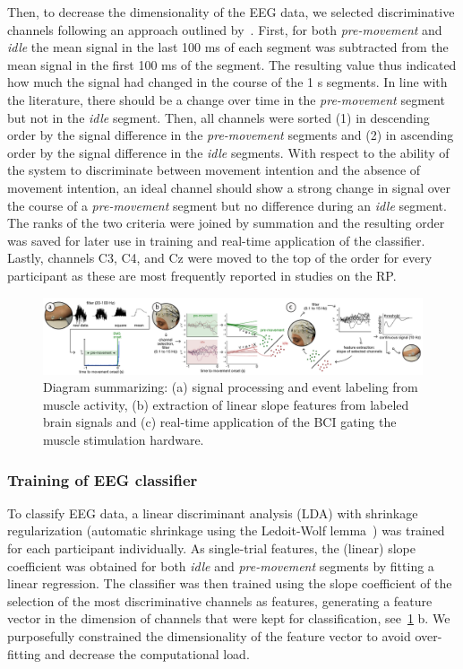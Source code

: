 Then, to decrease the dimensionality of the EEG data, we selected discriminative channels following an approach outlined by~\citep{Schultze-Kraft2021-cu}. First, for both \textit{pre-movement} and \textit{idle} the mean signal in the last 100 ms of each segment was subtracted from the mean signal in the first 100 ms of the segment. The resulting value thus indicated how much the signal had changed in the course of the 1 s segments. In line with the literature, there should be a change over time in the \textit{pre-movement} segment but not in the \textit{idle} segment. Then, all channels were sorted (1) in descending order by the signal difference in the \textit{pre-movement} segments and (2) in ascending order by the signal difference in the \textit{idle} segments. With respect to the ability of the system to discriminate between movement intention and the absence of movement intention, an ideal channel should show a strong change in signal over the course of a \textit{pre-movement} segment but no difference during an \textit{idle} segment. The ranks of the two criteria were joined by summation and the resulting order was saved for later use in training and real-time application of the classifier. Lastly, channels C3, C4, and Cz were moved to the top of the order for every participant as these are most frequently reported in studies on the RP.

\begin{figure}[!h]
    \centering
    \includegraphics[width=\textwidth]{figures/method.png}
    \caption{Diagram summarizing: (a) signal processing and event labeling from muscle activity, (b) extraction of linear slope features from labeled brain signals and (c) real-time application of the BCI gating the muscle stimulation hardware.}
    \label{fig:method}
\end{figure}

\subsubsection{Training of EEG classifier}
To classify EEG data, a linear discriminant analysis (LDA) with shrinkage regularization (automatic shrinkage using the Ledoit-Wolf lemma~\cite{Ledoit2004-bi}) was trained for each participant individually. As single-trial features, the (linear) slope coefficient was obtained for both \textit{idle} and \textit{pre-movement} segments by fitting a linear regression. The classifier was then trained using the slope coefficient of the selection of the most discriminative channels as features, generating a feature vector in the dimension of channels that were kept for classification, see~\ref{fig:method} b. We purposefully constrained the dimensionality of the feature vector to avoid over-fitting and decrease the computational load.

